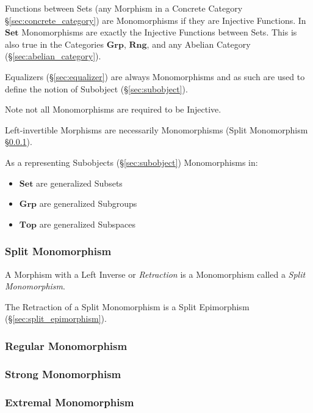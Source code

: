 Functions between Sets (any Morphism in a Concrete Category
\S\ref{sec:concrete_category}) are Monomorphisms if they are Injective
Functions. In $\mathbf{Set}$ Monomorphisms are exactly the Injective
Functions between Sets. This is also true in the Categories
$\mathbf{Grp}$, $\mathbf{Rng}$, and any Abelian Category
(\S\ref{sec:abelian_category}).

Equalizers (\S\ref{sec:equalizer}) are always Monomorphisms and as
such are used to define the notion of Subobject
(\S\ref{sec:subobject}).

\HandRight\; Note not all Monomorphisms are required to be Injective.

Left-invertible Morphisms are necessarily Monomorphisms (Split
Monomorphism \S\ref{sec:split_monomorphism}).

As a representing Subobjects (\S\ref{sec:subobject}) Monomorphisms in:
\begin{itemize}
  \item $\mathbf{Set}$ are generalized Subsets
  \item $\mathbf{Grp}$ are generalized Subgroups
  \item $\mathbf{Top}$ are generalized Subspaces
\end{itemize}



\subsubsection{Split Monomorphism}\label{sec:split_monomorphism}

A Morphism with a Left Inverse or \emph{Retraction} is a Monomorphism
called a \emph{Split Monomorphism}.

The Retraction of a Split Monomorphism is a Split Epimorphism
(\S\ref{sec:split_epimorphism}).



\subsubsection{Regular Monomorphism}\label{sec:regular_monomorphism}

\subsubsection{Strong Monomorphism}\label{sec:strong_monomorphism}

\subsubsection{Extremal Monomorphism}\label{sec:extremal_monomorphism}




